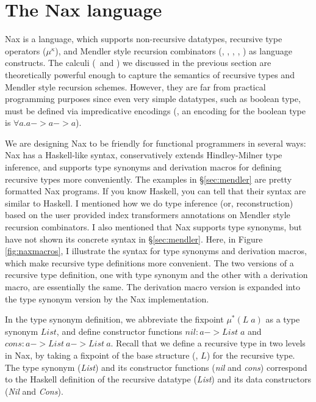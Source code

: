 \section{The Nax language}\label{sec:Nax}

Nax is a language, which supports non-recursive datatypes, recursive type
operators ($\mu^\kappa$), and Mendler style recursion combinators (\MIt, \MPr,
\McvIt, \McvPr, \MsfIt) as language constructs. The calculi (\Fi\ and \Fixi)
we discussed in the previous section are theoretically powerful enough to
capture the semantics of recursive types and Mendler style recursion schemes.
However, they are far from practical programming purposes since even very simple
datatypes, such as boolean type, must be defined via impredicative encodings
(\eg, an encoding for the boolean type is $\forall a . a -> a -> a$).

We are designing Nax to be friendly for functional programmers in several ways:
Nax has a Haskell-like syntax, conservatively extends Hindley-Milner
type inference, and supports type synonyms and derivation macros for defining
recursive types more conveniently. The examples in \S\ref{sec:mendler}
are pretty formatted Nax programs. If you know Haskell, you can tell
that their syntax are similar to Haskell. I mentioned how we do
type inference (or, reconstruction) based on the user provided
index transformers annotations on Mendler style recursion combinators.
I also mentioned that Nax supports type synonyms, but have not shown its
concrete syntax in \S\ref{sec:mendler}. Here, in Figure \ref{fig:naxmacros},
I illustrate the syntax for type synonyms and derivation macros, which make
recursive type definitions more convenient. The two versions of
a recursive type definition, one with type synonym and
the other with a derivation macro, are essentially the same.
The derivation macro version is expanded into the type synonym version
by the Nax implementation.

In the type synonym definition, we abbreviate the fixpoint $\mu^{*}(L\;a)$
as a type synonym $List$, and define constructor functions
$\textit{nil} : a -> \textit{List}\;a$ and
$\textit{cons} : a -> \textit{List}~a -> \textit{List}~a$.
Recall that we define a recursive type in two levels in Nax,
by taking a fixpoint of the base structure (\eg, $L$) for the recursive type.
The type synonym (\textit{List}) and its constructor functions
(\textit{nil} and \textit{cons}) correspond to the Haskell definition of
the recursive datatype (\textit{List}) and its data constructors
(\textit{Nil} and \textit{Cons}).

